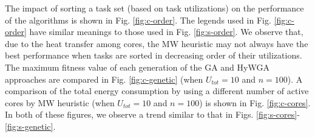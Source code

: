 \documentclass[conference]{IEEEtran}
\begin{document}



The impact of sorting a task set (based on task utilizations) on the performance of the algorithms is shown in Fig. \ref{fig:c-order}.
The legends used in Fig. \ref{fig:c-order} have similar meanings to those used in Fig. \ref{fig:s-order}. We observe that, due to the heat transfer among cores, the MW heuristic may not always have the best performance when tasks are sorted in decreasing order of their utilizations.
The maximum fitness value of each generation of the GA and HyWGA approaches are compared in Fig. \ref{fig:c-genetic} (when $U_{tot}=10$ and $n=100$).
A comparison of the total energy consumption by using a different number of active cores by MW heuristic (when $U_{tot}=10$ and $n=100$)
is shown in Fig. \ref{fig:c-cores}. In both of these figures, we observe a  trend similar to that in  Figs. \ref{fig:s-cores}-\ref{fig:s-genetic}.
\end{document}

